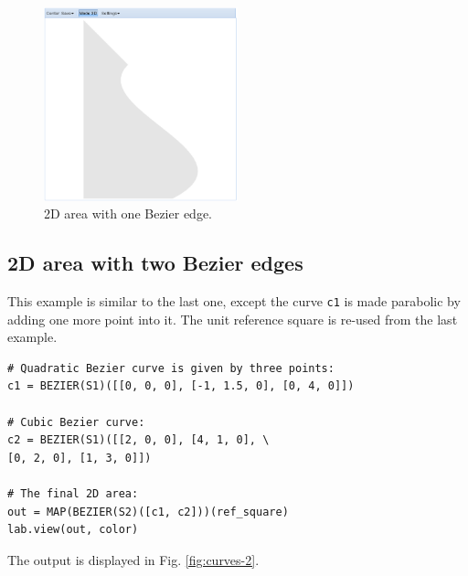 \documentclass[article,A4,12pt]{llncs}
\begin{document}
\newpage

\begin{figure}[!ht]
\begin{center}
\includegraphics[width=0.5\textwidth]{img/curves-1.png}
\end{center}
\vspace{-2mm}
\caption{2D area with one Bezier edge.}
\label{fig:curves-1}
\end{figure}


\subsection{2D area with two Bezier edges}

This example is similar to the last one, except the curve {\tt c1} is 
made parabolic by adding one more point into it. The unit reference square 
is re-used from the last example.

\begin{verbatim}
# Quadratic Bezier curve is given by three points:
c1 = BEZIER(S1)([[0, 0, 0], [-1, 1.5, 0], [0, 4, 0]])

# Cubic Bezier curve:
c2 = BEZIER(S1)([[2, 0, 0], [4, 1, 0], \
[0, 2, 0], [1, 3, 0]])

# The final 2D area:
out = MAP(BEZIER(S2)([c1, c2]))(ref_square)
lab.view(out, color)
\end{verbatim}
The output is displayed in Fig. \ref{fig:curves-2}.

\newpage
\end{document}

